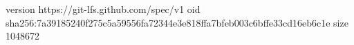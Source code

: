 version https://git-lfs.github.com/spec/v1
oid sha256:7a39185240f275c5a59556fa72344e3e818ffa7bfeb003c6bffe33cd16eb6c1e
size 1048672
